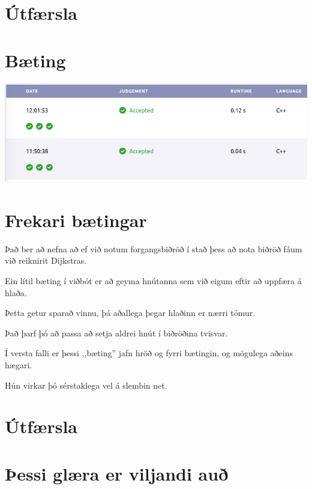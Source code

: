 \section{Útfærsla}
{
}

\section{Bæting}
{
    {
        \includegraphics[scale = 0.35]{fig/ex.png}
    }
}

\section{Frekari bætingar}
{
    {
        \item<1-> Það ber að nefna að ef við notum forgangsbiðröð í stað þess að nota biðröð fáum við reiknirit Dijkstras.
        \item<2-> Ein lítil bæting í viðbót er að geyma hnútanna sem við eigum eftir að uppfæra á hlaða.
        \item<3-> Þetta getur sparað vinnu, þá aðallega þegar hlaðinn er nærri tómur.
        \item<4-> Það þarf þó að passa að setja aldrei hnút í biðröðina tvisvar.
        \item<5-> Í versta falli er þessi ,,bæting'' jafn hröð og fyrri bætingin, og mögulega aðeins hægari.
        \item<6-> Hún virkar þó sérstaklega vel á slembin net.
    }
}

\section{Útfærsla}
{
}

\section{Þessi glæra er viljandi auð}
{
}


